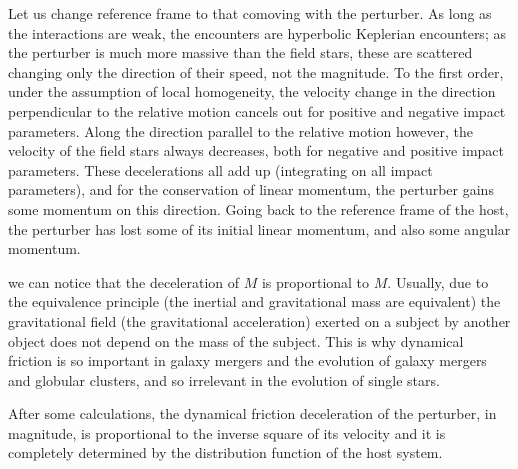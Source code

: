 \documentclass[a4paper,12pt]{article}
\begin{document}
Let us change reference frame to that comoving with the perturber. As long as the interactions are weak, the encounters are hyperbolic Keplerian encounters; as the perturber is much more massive than the field stars, these are scattered changing only the direction of their speed, not the magnitude. To the first order, under the assumption of local homogeneity, the velocity change in the direction perpendicular to the relative motion cancels out for positive and negative impact parameters.
Along the direction parallel to the relative motion however, the velocity of the field stars always decreases, both for negative and positive impact parameters. These decelerations all add up (integrating on all impact parameters), and for the conservation of linear momentum, the perturber gains some momentum on this direction.
Going back to the reference frame of the host, the perturber has lost some of its initial linear momentum, and also some angular momentum.

we can notice that the deceleration of $M$ is proportional to $M$. Usually, due to the equivalence principle (the inertial and gravitational mass are equivalent) the gravitational field (the gravitational acceleration) exerted on a subject by another object does not depend on the mass of the subject. This is why dynamical friction is so important in galaxy mergers and the evolution of galaxy mergers and globular clusters, and so irrelevant in the evolution of single stars.

After some calculations, the dynamical friction deceleration of the perturber, in magnitude, is proportional to the inverse square of its velocity and it is completely determined by the distribution function of the host system.
\end{document}
